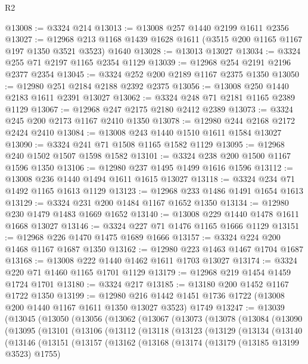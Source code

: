 \begin{lexlean}{R2}
\begin{coremodule}
@13008 := @3324 @214
@13013 := @13008 @257 @1440 @2199 @1611 @2356
@13027 := @12968 @213 @1168 @1439 @1628 @1611 (@3515 @200 @1165 @1167 @197 @1350 @3521 @3523) @1640
@13028 := @13013 @13027
@13034 := @3324 @255 @71 @2197 @1165 @2354 @1129
@13039 := @12968 @254 @2191 @2196 @2377 @2354
@13045 := @3324 @252 @200 @2189 @1167 @2375 @1350
@13050 := @12980 @251 @2184 @2188 @2392 @2375
@13056 := @13008 @250 @1440 @2183 @1611 @2391 @13027
@13062 := @3324 @248 @71 @2181 @1165 @2389 @1129
@13067 := @12968 @247 @2175 @2180 @2412 @2389
@13073 := @3324 @245 @200 @2173 @1167 @2410 @1350
@13078 := @12980 @244 @2168 @2172 @2424 @2410
@13084 := @13008 @243 @1440 @1510 @1611 @1584 @13027
@13090 := @3324 @241 @71 @1508 @1165 @1582 @1129
@13095 := @12968 @240 @1502 @1507 @1598 @1582
@13101 := @3324 @238 @200 @1500 @1167 @1596 @1350
@13106 := @12980 @237 @1495 @1499 @1616 @1596
@13112 := @13008 @236 @1440 @1494 @1611 @1615 @13027
@13118 := @3324 @234 @71 @1492 @1165 @1613 @1129
@13123 := @12968 @233 @1486 @1491 @1654 @1613
@13129 := @3324 @231 @200 @1484 @1167 @1652 @1350
@13134 := @12980 @230 @1479 @1483 @1669 @1652
@13140 := @13008 @229 @1440 @1478 @1611 @1668 @13027
@13146 := @3324 @227 @71 @1476 @1165 @1666 @1129
@13151 := @12968 @226 @1470 @1475 @1689 @1666
@13157 := @3324 @224 @200 @1468 @1167 @1687 @1350
@13162 := @12980 @223 @1463 @1467 @1704 @1687
@13168 := @13008 @222 @1440 @1462 @1611 @1703 @13027
@13174 := @3324 @220 @71 @1460 @1165 @1701 @1129
@13179 := @12968 @219 @1454 @1459 @1724 @1701
@13180 := @3324 @217
@13185 := @13180 @200 @1452 @1167 @1722 @1350
@13199 := @12980
    @216
    @1442
    @1451
    @1736
    @1722
    (@13008 @200 @1440 @1167 @1611 @1350 @13027 @3523)
    @1749
@13247 := @13039
    (@13045
      (@13050
        (@13056
          (@13062
            (@13067
              (@13073
                (@13078
                  (@13084
                    (@13090
                      (@13095
                        (@13101
                          (@13106
                            (@13112
                              (@13118
                                (@13123
                                  (@13129
                                    (@13134
                                      (@13140
                                        (@13146
                                          (@13151
                                            (@13157
                                              (@13162
                                                (@13168
                                                  (@13174
                                                    (@13179 (@13185 @13199 @3523) @1755)

\end{coremodule}
\end{lexlean}

